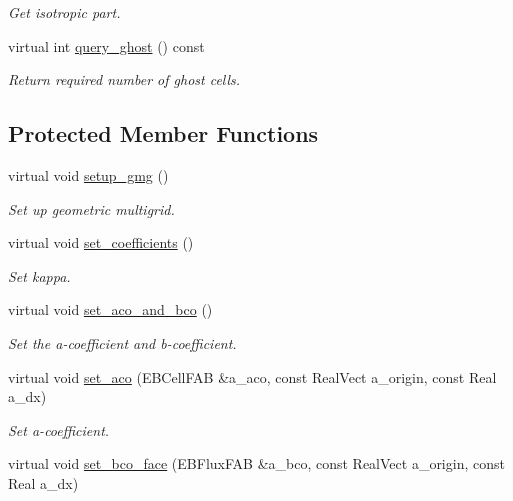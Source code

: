 \begin{DoxyCompactItemize}
\begin{DoxyCompactList}\small\item\em Get isotropic part. \end{DoxyCompactList}\item 
virtual int \hyperlink{classeddington__sp1_af4664b17d9e08ab51a6569e85531d05c}{query\+\_\+ghost} () const 
\begin{DoxyCompactList}\small\item\em Return required number of ghost cells. \end{DoxyCompactList}\end{DoxyCompactItemize}
\subsection*{Protected Member Functions}
\begin{DoxyCompactItemize}
\item 
virtual void \hyperlink{classeddington__sp1_a2a6a6d92ad876aaa37f48b1ad8deaf6b}{setup\+\_\+gmg} ()
\begin{DoxyCompactList}\small\item\em Set up geometric multigrid. \end{DoxyCompactList}\item 
virtual void \hyperlink{classeddington__sp1_aab5aff4c311559018d3f434dba9f87b2}{set\+\_\+coefficients} ()
\begin{DoxyCompactList}\small\item\em Set kappa. \end{DoxyCompactList}\item 
virtual void \hyperlink{classeddington__sp1_ab284d1174cd0e6a5347f5b3682cb748e}{set\+\_\+aco\+\_\+and\+\_\+bco} ()
\begin{DoxyCompactList}\small\item\em Set the a-\/coefficient and b-\/coefficient. \end{DoxyCompactList}\item 
virtual void \hyperlink{classeddington__sp1_abadb688041f5ed61ad32507ab031b0c1}{set\+\_\+aco} (E\+B\+Cell\+F\+AB \&a\+\_\+aco, const Real\+Vect a\+\_\+origin, const Real a\+\_\+dx)
\begin{DoxyCompactList}\small\item\em Set a-\/coefficient. \end{DoxyCompactList}\item 
virtual void \hyperlink{classeddington__sp1_aa71d1464e74483e163cf38d5f5c5859a}{set\+\_\+bco\+\_\+face} (E\+B\+Flux\+F\+AB \&a\+\_\+bco, const Real\+Vect a\+\_\+origin, const Real a\+\_\+dx)

\end{DoxyCompactItemize}
